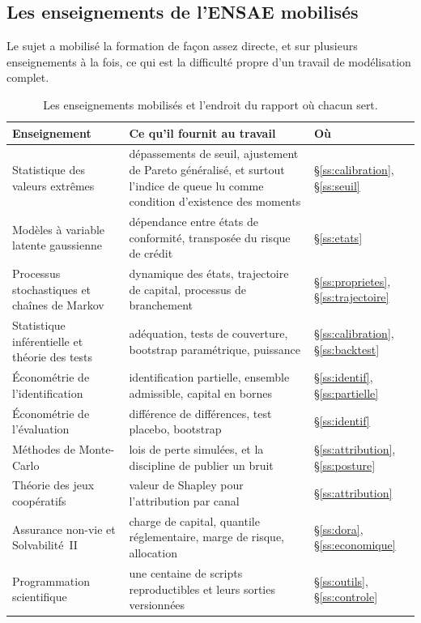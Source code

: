 \documentclass[12pt,a4paper]{article}
\theoremstyle{definition}
\begin{document}
\subsection{Les enseignements de l'ENSAE mobilisés}
\label{ss:ensae}

Le sujet a mobilisé la formation de façon assez directe, et sur plusieurs
enseignements à la fois, ce qui est la difficulté propre d'un travail de
modélisation complet.

\begin{table}[htbp]
\centering\small
\renewcommand{\arraystretch}{1.2}
\begin{tabular}{@{}>{\raggedright\arraybackslash}p{4.2cm}>{\raggedright\arraybackslash}p{7.4cm}>{\raggedright\arraybackslash}p{2.3cm}@{}}
\toprule
\textbf{Enseignement} & \textbf{Ce qu'il fournit au travail} & \textbf{Où} \\
\midrule
Statistique des valeurs extrêmes &
dépassements de seuil, ajustement de Pareto généralisé, et surtout l'indice de
queue lu comme condition d'existence des moments &
\S\ref{ss:calibration}, \S\ref{ss:seuil} \\
Modèles à variable latente gaussienne &
dépendance entre états de conformité, transposée du risque de crédit &
\S\ref{ss:etats} \\
Processus stochastiques et chaînes de Markov &
dynamique des états, trajectoire de capital, processus de branchement &
\S\ref{ss:proprietes}, \S\ref{ss:trajectoire} \\
Statistique inférentielle et théorie des tests &
adéquation, tests de couverture, bootstrap paramétrique, puissance &
\S\ref{ss:calibration}, \S\ref{ss:backtest} \\
Économétrie de l'identification &
identification partielle, ensemble admissible, capital en bornes &
\S\ref{ss:identif}, \S\ref{ss:partielle} \\
Économétrie de l'évaluation &
différence de différences, test placebo, bootstrap &
\S\ref{ss:identif} \\
Méthodes de Monte-Carlo &
lois de perte simulées, et la discipline de publier un bruit &
\S\ref{ss:attribution}, \S\ref{ss:posture} \\
Théorie des jeux coopératifs &
valeur de Shapley pour l'attribution par canal &
\S\ref{ss:attribution} \\
Assurance non-vie et Solvabilité~II &
charge de capital, quantile réglementaire, marge de risque, allocation &
\S\ref{ss:dora}, \S\ref{ss:economique} \\
Programmation scientifique &
une centaine de scripts reproductibles et leurs sorties versionnées &
\S\ref{ss:outils}, \S\ref{ss:controle} \\
\bottomrule
\end{tabular}
\caption{Les enseignements mobilisés et l'endroit du rapport où chacun sert.}
\label{tab:ensae}
\end{table}
\end{document}
